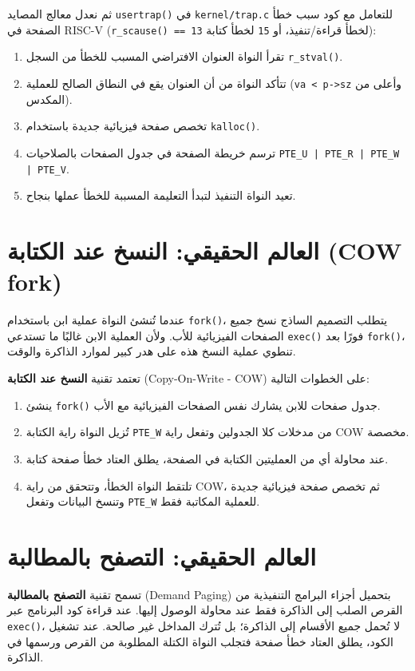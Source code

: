 ثم نعدل معالج المصايد \texttt{usertrap()} في \texttt{kernel/trap.c} للتعامل مع كود سبب خطأ الصفحة في RISC-V (\texttt{r\_scause() == 13} لخطأ قراءة/تنفيذ، أو \texttt{15} لخطأ كتابة):
\begin{enumerate}
  \item تقرأ النواة العنوان الافتراضي المسبب للخطأ من السجل \texttt{r\_stval()}.
  \item تتأكد النواة من أن العنوان يقع في النطاق الصالح للعملية (\texttt{va < p->sz} وأعلى من المكدس).
  \item تخصص صفحة فيزيائية جديدة باستخدام \texttt{kalloc()}.
  \item ترسم خريطة الصفحة في جدول الصفحات بالصلاحيات \texttt{PTE\_U | PTE\_R | PTE\_W | PTE\_V}.
  \item تعيد النواة التنفيذ لتبدأ التعليمة المسببة للخطأ عملها بنجاح.
\end{enumerate}

\section{العالم الحقيقي: النسخ عند الكتابة (COW fork)}
\label{sec:cow_fork}

عندما تُنشئ النواة عملية ابن باستخدام \texttt{fork()}، يتطلب التصميم الساذج نسخ جميع الصفحات الفيزيائية للأب.
ولأن العملية الابن غالبًا ما تستدعي \texttt{exec()} فورًا بعد \texttt{fork()}، تنطوي عملية النسخ هذه على هدر كبير لموارد الذاكرة والوقت.

تعتمد تقنية \textbf{النسخ عند الكتابة} (Copy-On-Write - COW) على الخطوات التالية:
\begin{enumerate}
  \item ينشئ \texttt{fork()} جدول صفحات للابن يشارك نفس الصفحات الفيزيائية مع الأب.
  \item تُزيل النواة راية الكتابة \texttt{PTE\_W} من مدخلات كلا الجدولين وتفعل راية COW مخصصة.
  \item عند محاولة أي من العمليتين الكتابة في الصفحة، يطلق العتاد خطأ صفحة كتابة.
  \item تلتقط النواة الخطأ، وتتحقق من راية COW، ثم تخصص صفحة فيزيائية جديدة وتنسخ البيانات وتفعل \texttt{PTE\_W} للعملية المكاتبة فقط.
\end{enumerate}

\section{العالم الحقيقي: التصفح بالمطالبة}
\label{sec:demand_paging}

تسمح تقنية \textbf{التصفح بالمطالبة} (Demand Paging) بتحميل أجزاء البرامج التنفيذية من القرص الصلب إلى الذاكرة فقط عند محاولة الوصول إليها.
عند قراءة كود البرنامج عبر \texttt{exec()}، لا تُحمل جميع الأقسام إلى الذاكرة؛ بل تُترك المداخل غير صالحة.
عند تشغيل الكود، يطلق العتاد خطأ صفحة فتجلب النواة الكتلة المطلوبة من القرص ورسمها في الذاكرة.

